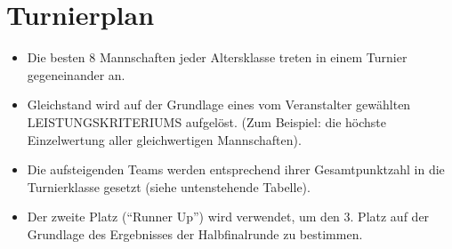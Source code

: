 \documentclass[a4paper,12pt]{article}
\begin{document}
\section{Turnierplan}
\begin{itemize}
	\item Die besten 8 Mannschaften jeder Altersklasse treten in einem Turnier gegeneinander an.
	\item Gleichstand wird auf der Grundlage eines vom Veranstalter gewählten LEISTUNGSKRITERIUMS aufgelöst. (Zum Beispiel: die höchste Einzelwertung aller gleichwertigen Mannschaften).
	\item Die aufsteigenden Teams werden entsprechend ihrer Gesamtpunktzahl in die Turnierklasse gesetzt (siehe untenstehende Tabelle).
		\begin{figure}[H]
			\centering
			\def\svgwidth{\columnwidth}
			
		\end{figure}
	\item Der zweite Platz ("`Runner Up"') wird verwendet, um den 3. Platz auf der Grundlage des Ergebnisses der Halbfinalrunde zu bestimmen.
\end{itemize}
\end{document}
